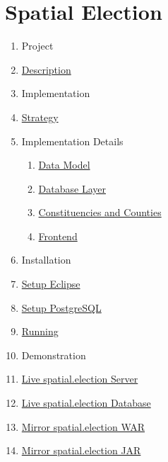 
\section{Spatial Election}

\begin{enumerate}
\def\labelenumi{\arabic{enumi}.}
\item
  Project
\item
  \href{https://github.com/a-d/spatial.election/wiki/Description-and-Setup}{Description}
\item
  Implementation
\item
  \href{https://github.com/a-d/spatial.election/wiki/Strategy}{Strategy}
\item
  Implementation Details

  \begin{enumerate}
  \def\labelenumii{\arabic{enumii}.}
  \itemsep1pt\parskip0pt
  \item
    \href{https://github.com/a-d/spatial.election/wiki/Datenmodell}{Data
    Model}
  \item
    \href{https://github.com/a-d/spatial.election/wiki/Database-Layer}{Database
    Layer}
  \item
    \href{https://github.com/a-d/spatial.election/wiki/Constituencies-and-Counties}{Constituencies
    and Counties}
  \item
    \href{https://github.com/a-d/spatial.election/wiki/Frontend}{Frontend}
  \end{enumerate}
\item
  Installation
\item
  \href{https://github.com/a-d/spatial.election/wiki/Setup-Eclipse}{Setup
  Eclipse}
\item
  \href{https://github.com/a-d/spatial.election/wiki/Setup-PostgreSQL}{Setup
  PostgreSQL}
\item
  \href{https://github.com/a-d/spatial.election/wiki/Running}{Running}
\item
  Demonstration
\item
  \href{http://178.254.23.23:9191/}{Live spatial.election Server}
\item
  \href{postgresql://178.254.23.23:5432}{Live spatial.election Database}
\item
  \href{http://userpage.fu-berlin.de/~al3x/spatial.election.war}{Mirror
  spatial.election WAR}
\item
  \href{http://userpage.fu-berlin.de/~al3x/spatial.election.jar}{Mirror
  spatial.election JAR}
\end{enumerate}

